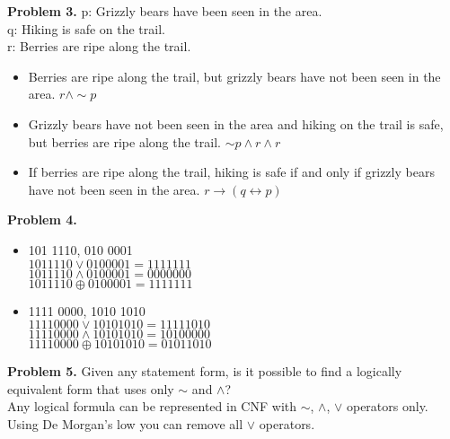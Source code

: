 \documentclass[a4paper,12pt]{article}
\newenvironment{problem}[1]{\par\bigskip\noindent\textbf{Problem #1.} \newline}{}
\begin{document}
  \begin{problem}{3}
    p: Grizzly bears have been seen in the area.\\
    q: Hiking is safe on the trail.\\
    r: Berries are ripe along the trail.\\
    \begin{itemize}
    \item Berries are ripe along the trail, but grizzly bears have not been seen in the area. $r \wedge \sim p$
    \item Grizzly bears have not been seen in the area and hiking on the trail is safe, but berries are ripe along the trail. $\sim p \wedge r \wedge r$
    \item If berries are ripe along the trail, hiking is safe if and only if
      grizzly bears have not been seen in the area. $r \rightarrow (q \leftrightarrow p)$
    \end{itemize}
  \end{problem}

  \begin{problem}{4}

    \begin{itemize}
    \item 101 1110, 010 0001 \\
    $101 1110 \vee 010 0001 = 111 1111$\\
    $101 1110 \wedge 010 0001 = 000 0000$\\
    $101 1110 \oplus 010 0001 = 111 1111$\\
    \item 1111 0000, 1010 1010 \\
    $1111 0000 \vee 1010 1010 = 1111 1010$\\
    $1111 0000 \wedge 1010 1010 = 1010 0000$\\
    $1111 0000 \oplus 1010 1010 = 0101 1010$\\  
    \end{itemize}
  \end{problem}

  \begin{problem}{5}
    Given any statement form, is it possible to find a logically equivalent form
    that uses only $\sim$ and $\wedge$? \\
    Any logical formula can be represented in CNF with $\sim$, $\wedge$, $\vee$ operators only. Using De Morgan's low you can remove all $\vee$ operators.
  \end{problem}
\end{document}
